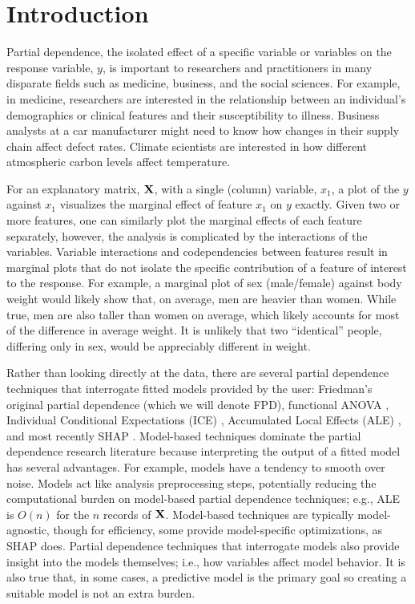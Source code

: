 \documentclass[]{article} %
\newcommand{\todo}[1]{{{\color{red}{#1}}}}
\begin{document}
\section{Introduction}

\todo{Indicate that we use a specific random seed for reproducibility.
Also, do multiple trials for the noise example as the last right edge graph does vary quite a bit.}

Partial dependence, the isolated effect of a specific variable or variables on the response variable, $y$, is important to researchers and practitioners in many disparate fields such as medicine, business, and the social sciences. For example, in medicine, researchers are interested in the relationship between an individual's demographics or clinical features and their susceptibility to illness. Business analysts at a car manufacturer might need to know how changes in their supply chain affect defect rates. Climate scientists are interested in how different atmospheric carbon levels affect temperature.

For an explanatory matrix, $\bf X$, with a single (column) variable, $x_1$, a plot of the $y$ against $x_1$ visualizes the marginal effect of feature $x_1$ on $y$ exactly. Given two or more features, one can similarly plot the marginal effects of each feature separately, however, the analysis is complicated by the interactions of the variables.   Variable interactions and codependencies between features result in marginal plots that do not isolate the specific contribution of a feature of interest to the response. For example, a marginal plot of sex (male/female) against body weight would likely show that, on average, men are heavier than women. While true, men are also taller than women on average, which likely accounts for most of the difference in average weight. It is unlikely that two ``identical'' people, differing only in sex, would be appreciably different in weight.  

Rather than looking directly at the data, there are several partial dependence techniques that interrogate fitted models provided by the user: Friedman's original partial dependence \citep{PDP} (which we will denote FPD), functional ANOVA \citep{fanova}, Individual Conditional Expectations (ICE) \citep{ICE}, Accumulated Local Effects (ALE) \citep{ALE}, and most recently SHAP \citep{shap}.  Model-based techniques dominate the partial dependence research literature because interpreting the output of a fitted model  has several advantages.  For example, models have a tendency to smooth over noise. Models act like analysis preprocessing steps, potentially reducing the computational burden on model-based partial dependence techniques; e.g., ALE is $O(n)$ for the $n$ records of $\bf X$. Model-based techniques are typically model-agnostic, though for efficiency, some provide model-specific optimizations, as SHAP does. Partial dependence techniques that interrogate models also provide insight into the models themselves; i.e., how variables affect model behavior.  It is also true that, in some cases, a predictive model is the primary goal so creating a suitable model is not an extra burden.
\end{document}
